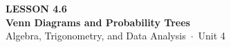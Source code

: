 \documentclass[aspectratio=169, 11pt]{beamer}
\begin{document}
{
\begin{frame}[plain]
  \vspace{2.8cm}\hspace{0.55cm}%
  \begin{minipage}{0.9\textwidth}
    {\color{goldacc}\bfseries\small LESSON 4.6}\\[0.5cm]
    {\color{white}\bfseries\LARGE Venn Diagrams and Probability Trees}\\[1.2cm]
    {\color{mistmid}\small Algebra, Trigonometry, and Data Analysis~$\cdot$~Unit 4}
  \end{minipage}
\end{frame}
}

\begin{frame}[t, plain]
\end{frame}
\end{document}
